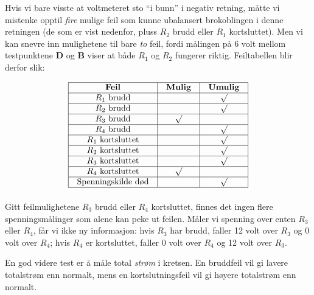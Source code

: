 
Hvis vi bare visste at voltmeteret sto ``i bunn'' i negativ retning, måtte vi mistenke opptil \textit{fire} mulige feil som kunne ubalansert brokoblingen i denne retningen (de som er vist nedenfor, pluss $R_2$ brudd eller $R_1$ kortsluttet). Men vi kan snevre inn mulighetene til bare \textit{to} feil, fordi målingen på 6 volt mellom testpunktene {\bf D} og {\bf B} viser at både $R_1$ og $R_2$ fungerer riktig. Feiltabellen blir derfor slik:


$$\vbox{\offinterlineskip
\halign{\strut
\vrule \quad\hfil # \ \hfil & 
\vrule \quad\hfil # \ \hfil & 
\vrule \quad\hfil # \ \hfil \vrule \cr
\noalign{\hrule}
%
{\bf Feil} & {\bf Mulig} & {\bf Umulig} \cr
%
\noalign{\hrule}
%
$R_1$ brudd &  & $\surd$ \cr
%
\noalign{\hrule}
%
$R_2$ brudd &  & $\surd$ \cr
%
\noalign{\hrule}
%
$R_3$ brudd & $\surd$ &  \cr
%
\noalign{\hrule}
%
$R_4$ brudd &  & $\surd$ \cr
%
\noalign{\hrule}
%
$R_1$ kortsluttet &  & $\surd$ \cr
%
\noalign{\hrule}
%
$R_2$ kortsluttet &  & $\surd$ \cr
%
\noalign{\hrule}
%
$R_3$ kortsluttet &  & $\surd$ \cr
%
\noalign{\hrule}
%
$R_4$ kortsluttet & $\surd$ &  \cr
%
\noalign{\hrule}
%
Spenningskilde død &  & $\surd$ \cr
%
\noalign{\hrule}
} %
}$$ %

Gitt feilmulighetene $R_3$ brudd eller $R_4$ kortsluttet, finnes det ingen flere spenningsmålinger som alene kan peke ut feilen. Måler vi spenning over enten $R_3$ eller $R_4$, får vi ikke ny informasjon: hvis $R_3$ har brudd, faller 12 volt over $R_3$ og 0 volt over $R_4$; hvis $R_4$ er kortsluttet, faller 0 volt over $R_4$ og 12 volt over $R_3$.

En god videre test er å måle total \textit{strøm} i kretsen. En bruddfeil vil gi lavere totalstrøm enn normalt, mens en kortslutningsfeil vil gi høyere totalstrøm enn normalt.


